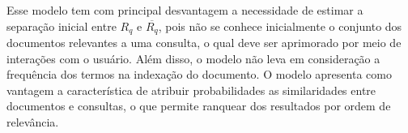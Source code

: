 Esse modelo tem com principal desvantagem a necessidade de estimar a separação inicial entre $R_q$ e $\overline{R_q}$, pois não se conhece inicialmente o conjunto dos documentos relevantes a uma consulta, o qual deve ser aprimorado por meio de interações com o usuário. Além disso, o modelo não leva em consideração a frequência dos termos na indexação do documento. O modelo apresenta como vantagem a característica de atribuir probabilidades as similaridades entre documentos e consultas, o que permite ranquear dos resultados por ordem de relevância. 












